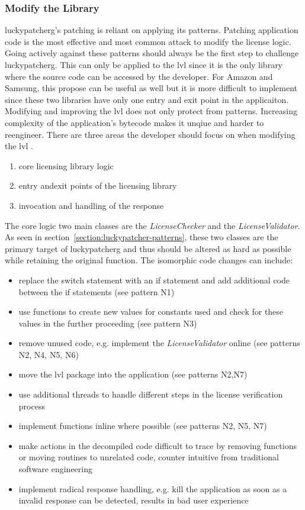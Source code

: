 \subsubsection{Modify the Library} \label{subsection:counter-modifications-library}
\gls{luckypatcherg}'s patching is reliant on applying its patterns.
Patching application code is the most effective and most common attack to modify the license logic.
Going actively against these patterns should always be the first step to challenge \gls{luckypatcherg}.
This can only be applied to the \gls{lvl} since it is the only library where the source code can be accessed by the developer.
For Amazon and Samsung, this propose can be useful as well but it is more difficult to implement since these two libraries have only one entry and exit point in the applicaiton.
\newline
Modifying and improving the \gls{lvl} does not only protect from patterns.
Increasing complexity of the application's bytecode makes it unqiue and harder to reengineer. \cite{developersSecuring}
\newline
There are three areas the developer should focus on when modifying the \gls{lvl}  \cite{developersSecuring}.
\begin{enumerate}
\item core licensing library logic
\item entry andexit points of the licensing library
\item invocation and handling of the response
\end{enumerate}
The core logic two main classes are the \textit{LicenseChecker} and the \textit{LicenseValidator}.
As seen in section~\ref{section:luckypatcher-patterns}, these two classes are the primary target of \gls{luckypatcherg} and thus should be altered as hard as possible while retaining the original function.
The isomorphic code changes can include:
\begin{itemize}
\item replace the switch statement with an if statement and add additional code between the if statements (see pattern N1)
\item use functions to create new values for constants used and check for these values in the further proceeding (see pattern N3)
\item remove unused code, e.g. implement the \textit{LicenseValidator} online (see patterns N2, N4, N5, N6)
\item move the \gls{lvl} package into the application (see patterns N2,N7)
\item use additional threads to handle different steps in the license verification process
\item implement functions inline where possible (see patterns N2, N5, N7)
\item make actions in the decompiled code difficult to trace by removing functions or moving routines to unrelated code, counter intuitive from traditional software engineering
\item implement radical response handling, e.g. kill the application as soon as a invalid response can be detected, results in bad user experience
\end{itemize}

